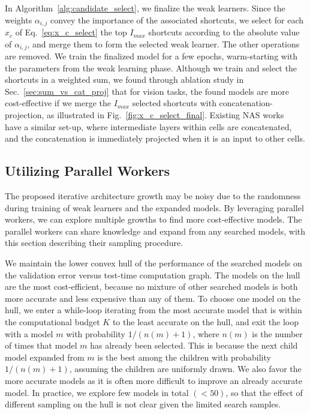 In Algorithm~\ref{alg:candidate_select}, we finalize the weak learners. Since the weights $\alpha_{i,j}$ convey the importance of the associated shortcuts, we select for each $x_c$ of Eq.~\ref{eq:x_c_select} the top $I_{max}$ shortcuts according to the absolute value of $\alpha_{i,j}$, and merge them to form the selected weak learner. The other operations are removed. 
We train the finalized model for a few epochs, warm-starting with the parameters from the weak learning phase. 
Although we train and select the shortcuts in a weighted sum, we found through ablation study in Sec.~\ref{sec:sum_vs_cat_proj} that for vision tasks, the found models are more cost-effective if we merge the $I_{max}$ selected shortcuts with concatenation-projection, as illustrated in Fig.~\ref{fig:x_c_select_final}. Existing NAS works~\citep{NASCell,Real2018RegularizedEF,Pham2018EfficientNA,Liu2018DARTSDA} have a similar set-up, where intermediate layers within cells are concatenated, and the concatenation is immediately projected when it is an input to other cells. 

\subsection{Utilizing Parallel Workers}
\label{sec:parent_choice}

The proposed iterative architecture growth may be noisy 
due to the randomness during training of weak learners and 
the expanded models. By leveraging parallel workers, we 
can explore multiple growths to find more cost-effective models. 
The parallel workers can share knowledge and expand from any searched models, 
with this section describing their sampling procedure.

We maintain the lower convex hull of the performance of the 
searched models on the validation error versus test-time computation 
graph. The models on the hull are the most cost-efficient, 
because no mixture of other searched models is both more accurate and less expensive
than any of them. To choose one model on the hull, we enter a while-loop
iterating from the most accurate model that is within the computational  
budget $K$ to the least accurate on the hull, 
and exit the loop with a model $m$ with probability $1/(n(m) + 1)$, 
where $n(m)$ is the number of times that model $m$ has already been selected. 
This is because the next child model expanded from $m$ is the best among the children with probability
$1/(n(m) + 1)$, assuming the children are uniformly drawn. 
We also favor the more accurate models as it is often more difficult to 
improve an already accurate model. In practice, we explore few 
models in total $(<50)$, so that the effect of different sampling on the hull 
is not clear given the limited search samples. 


